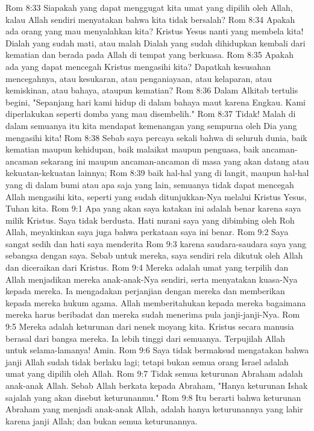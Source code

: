 Rom 8:33  Siapakah yang dapat menggugat kita umat yang dipilih oleh Allah, kalau Allah sendiri menyatakan bahwa kita tidak bersalah?
Rom 8:34  Apakah ada orang yang mau menyalahkan kita? Kristus Yesus nanti yang membela kita! Dialah yang sudah mati, atau malah Dialah yang sudah dihidupkan kembali dari kematian dan berada pada Allah di tempat yang berkuasa.
Rom 8:35  Apakah ada yang dapat mencegah Kristus mengasihi kita? Dapatkah kesusahan mencegahnya, atau kesukaran, atau penganiayaan, atau kelaparan, atau kemiskinan, atau bahaya, ataupun kematian?
Rom 8:36  Dalam Alkitab tertulis begini, "Sepanjang hari kami hidup di dalam bahaya maut karena Engkau. Kami diperlakukan seperti domba yang mau disembelih."
Rom 8:37  Tidak! Malah di dalam semuanya itu kita mendapat kemenangan yang sempurna oleh Dia yang mengasihi kita!
Rom 8:38  Sebab saya percaya sekali bahwa di seluruh dunia, baik kematian maupun kehidupan, baik malaikat maupun penguasa, baik ancaman-ancaman sekarang ini maupun ancaman-ancaman di masa yang akan datang atau kekuatan-kekuatan lainnya;
Rom 8:39  baik hal-hal yang di langit, maupun hal-hal yang di dalam bumi atau apa saja yang lain, semuanya tidak dapat mencegah Allah mengasihi kita, seperti yang sudah ditunjukkan-Nya melalui Kristus Yesus, Tuhan kita.
Rom 9:1  Apa yang akan saya katakan ini adalah benar karena saya milik Kristus. Saya tidak berdusta. Hati nurani saya yang dibimbing oleh Roh Allah, meyakinkan saya juga bahwa perkataan saya ini benar.
Rom 9:2  Saya sangat sedih dan hati saya menderita
Rom 9:3  karena saudara-saudara saya yang sebangsa dengan saya. Sebab untuk mereka, saya sendiri rela dikutuk oleh Allah dan diceraikan dari Kristus.
Rom 9:4  Mereka adalah umat yang terpilih dan Allah menjadikan mereka anak-anak-Nya sendiri, serta menyatakan kuasa-Nya kepada mereka. Ia mengadakan perjanjian dengan mereka dan memberikan kepada mereka hukum agama. Allah memberitahukan kepada mereka bagaimana mereka harus beribadat dan mereka sudah menerima pula janji-janji-Nya.
Rom 9:5  Mereka adalah keturunan dari nenek moyang kita. Kristus secara manusia berasal dari bangsa mereka. Ia lebih tinggi dari semuanya. Terpujilah Allah untuk selama-lamanya! Amin.
Rom 9:6  Saya tidak bermaksud mengatakan bahwa janji Allah sudah tidak berlaku lagi; tetapi bukan semua orang Israel adalah umat yang dipilih oleh Allah.
Rom 9:7  Tidak semua keturunan Abraham adalah anak-anak Allah. Sebab Allah berkata kepada Abraham, "Hanya keturunan Ishak sajalah yang akan disebut keturunanmu."
Rom 9:8  Itu berarti bahwa keturunan Abraham yang menjadi anak-anak Allah, adalah hanya keturunannya yang lahir karena janji Allah; dan bukan semua keturunannya.
